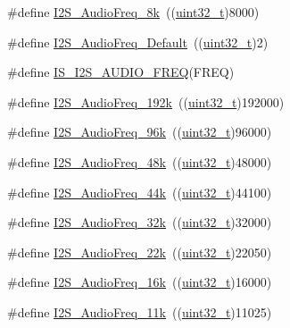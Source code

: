 \begin{DoxyCompactItemize}
\item 
\#define \hyperlink{group___i2_s___audio___frequency_ga7868ac234485a80d45586dd87cd00043}{I2\+S\+\_\+\+Audio\+Freq\+\_\+8k}~((\hyperlink{_p_e___types_8h_a33594304e786b158f3fb30289278f5af}{uint32\+\_\+t})8000)
\item 
\#define \hyperlink{group___i2_s___audio___frequency_ga30f78e8214e8a91cdb6d6360c1d3f18d}{I2\+S\+\_\+\+Audio\+Freq\+\_\+\+Default}~((\hyperlink{_p_e___types_8h_a33594304e786b158f3fb30289278f5af}{uint32\+\_\+t})2)
\item 
\#define \hyperlink{group___i2_s___audio___frequency_gaf39d917f4a38fd9916ec347fb055391c}{I\+S\+\_\+\+I2\+S\+\_\+\+A\+U\+D\+I\+O\+\_\+\+F\+R\+EQ}(F\+R\+EQ)
\item 
\#define \hyperlink{group___i2_s___audio___frequency_gadfdaed9a2acb71f2cdd737be81a6f747}{I2\+S\+\_\+\+Audio\+Freq\+\_\+192k}~((\hyperlink{_p_e___types_8h_a33594304e786b158f3fb30289278f5af}{uint32\+\_\+t})192000)
\item 
\#define \hyperlink{group___i2_s___audio___frequency_ga5acd02a974e90bb8f2c4e07f8fa0231b}{I2\+S\+\_\+\+Audio\+Freq\+\_\+96k}~((\hyperlink{_p_e___types_8h_a33594304e786b158f3fb30289278f5af}{uint32\+\_\+t})96000)
\item 
\#define \hyperlink{group___i2_s___audio___frequency_gac5f3f0416f9dd03d680d0fcee93b50ab}{I2\+S\+\_\+\+Audio\+Freq\+\_\+48k}~((\hyperlink{_p_e___types_8h_a33594304e786b158f3fb30289278f5af}{uint32\+\_\+t})48000)
\item 
\#define \hyperlink{group___i2_s___audio___frequency_ga3514e4c292b92b8a7d8a6916f4e3690c}{I2\+S\+\_\+\+Audio\+Freq\+\_\+44k}~((\hyperlink{_p_e___types_8h_a33594304e786b158f3fb30289278f5af}{uint32\+\_\+t})44100)
\item 
\#define \hyperlink{group___i2_s___audio___frequency_gac501b566718f4890aaafa323a33b732c}{I2\+S\+\_\+\+Audio\+Freq\+\_\+32k}~((\hyperlink{_p_e___types_8h_a33594304e786b158f3fb30289278f5af}{uint32\+\_\+t})32000)
\item 
\#define \hyperlink{group___i2_s___audio___frequency_gac6adafe5586e83c2408f1eab8edb4ab3}{I2\+S\+\_\+\+Audio\+Freq\+\_\+22k}~((\hyperlink{_p_e___types_8h_a33594304e786b158f3fb30289278f5af}{uint32\+\_\+t})22050)
\item 
\#define \hyperlink{group___i2_s___audio___frequency_ga5b8f2f8393e022becf0dbb04d1b01950}{I2\+S\+\_\+\+Audio\+Freq\+\_\+16k}~((\hyperlink{_p_e___types_8h_a33594304e786b158f3fb30289278f5af}{uint32\+\_\+t})16000)
\item 
\#define \hyperlink{group___i2_s___audio___frequency_ga3adf95fadd1ad75670ed1babd5faca39}{I2\+S\+\_\+\+Audio\+Freq\+\_\+11k}~((\hyperlink{_p_e___types_8h_a33594304e786b158f3fb30289278f5af}{uint32\+\_\+t})11025)

\end{DoxyCompactItemize}
